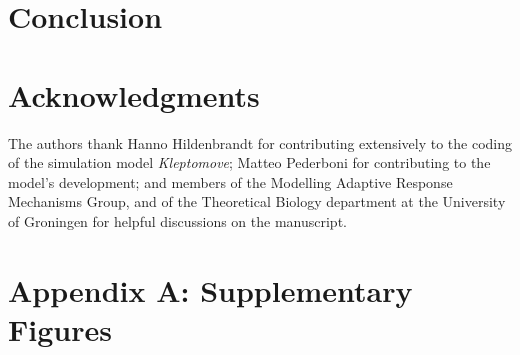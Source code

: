 \documentclass[11pt]{article}
\begin{document}
\section*{Conclusion}



\section*{Acknowledgments}

The authors thank Hanno Hildenbrandt for contributing extensively to the coding of the simulation model \textit{Kleptomove};
Matteo Pederboni for contributing to the model's development; 
and members of the Modelling Adaptive Response Mechanisms Group, and of the Theoretical Biology department at the University of Groningen for helpful discussions on the manuscript.



\newpage{}

\section*{Appendix A: Supplementary Figures}

%
%
%
%
%
\end{document}
